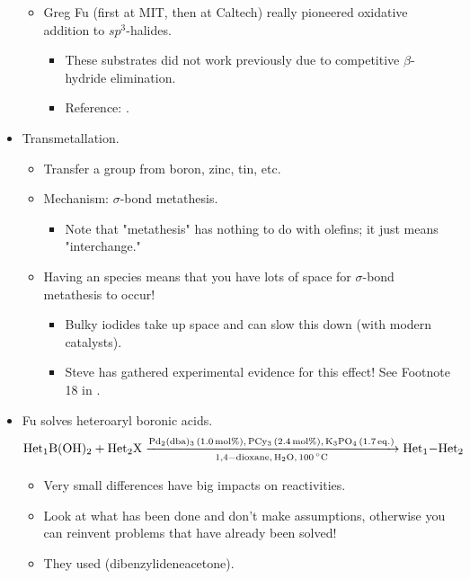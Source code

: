 \documentclass[../notes.tex]{subfiles}
\begin{document}
\begin{itemize}
\begin{itemize}
\begin{itemize}
        \end{itemize}
        \item Greg Fu (first at MIT, then at Caltech) really pioneered oxidative addition to $sp^3$-halides.
        \begin{itemize}
            \item These substrates did not work previously due to competitive $\beta$-hydride elimination.
            \item Reference: \textcite{bib:FuAlkyl}.
        \end{itemize}
    \end{itemize}
    \item Transmetallation.
    \begin{itemize}
        \item Transfer a group from boron, zinc, tin, etc.
        \item Mechanism: $\sigma$-bond metathesis.
        \begin{itemize}
            \item Note that "metathesis" has nothing to do with olefins; it just means "interchange."
        \end{itemize}
        \item Having an  species means that you have lots of space for $\sigma$-bond metathesis to occur!
        \begin{itemize}
            \item Bulky iodides take up space and can slow this down (with modern catalysts).
            \item Steve has gathered experimental evidence for this effect! See Footnote 18 in \textcite{bib:BuchwaldTransmetal}.
        \end{itemize}
    \end{itemize}
    \item Fu solves heteroaryl boronic acids.
    \begin{equation*}
        \ce{Het1B(OH)2 + Het2X ->[Pd2(dba)3 (1.0 mol\%), PCy3 (2.4 mol\%), K3PO4 (1.7 {eq.})][1,4-dioxane, H2O, \SI{100}{\celsius}] Het1-Het2}
    \end{equation*}
    \begin{itemize}
        \item Very small differences have big impacts on reactivities.
        \item Look at what has been done and don't make assumptions, otherwise you can reinvent problems that have already been solved!
        \item They used  (dibenzylideneacetone).

\end{itemize}
\end{itemize}
\end{document}
